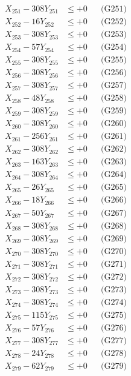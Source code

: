 \documentclass[a4paper,10pt]{article}
\begin{document}
{\begin{align}
\allowbreak
X_{251} - 308Y_{251} &\leq +0 && \text{(G251)} \\
X_{252} - 16Y_{252} &\leq +0 && \text{(G252)} \\
X_{253} - 308Y_{253} &\leq +0 && \text{(G253)} \\
X_{254} - 57Y_{254} &\leq +0 && \text{(G254)} \\
X_{255} - 308Y_{255} &\leq +0 && \text{(G255)} \\
X_{256} - 308Y_{256} &\leq +0 && \text{(G256)} \\
X_{257} - 308Y_{257} &\leq +0 && \text{(G257)} \\
X_{258} - 48Y_{258} &\leq +0 && \text{(G258)} \\
X_{259} - 308Y_{259} &\leq +0 && \text{(G259)} \\
X_{260} - 308Y_{260} &\leq +0 && \text{(G260)} \\
\allowbreak
X_{261} - 256Y_{261} &\leq +0 && \text{(G261)} \\
X_{262} - 308Y_{262} &\leq +0 && \text{(G262)} \\
X_{263} - 163Y_{263} &\leq +0 && \text{(G263)} \\
X_{264} - 308Y_{264} &\leq +0 && \text{(G264)} \\
X_{265} - 26Y_{265} &\leq +0 && \text{(G265)} \\
X_{266} - 18Y_{266} &\leq +0 && \text{(G266)} \\
X_{267} - 50Y_{267} &\leq +0 && \text{(G267)} \\
X_{268} - 308Y_{268} &\leq +0 && \text{(G268)} \\
X_{269} - 308Y_{269} &\leq +0 && \text{(G269)} \\
X_{270} - 308Y_{270} &\leq +0 && \text{(G270)} \\
\allowbreak
X_{271} - 308Y_{271} &\leq +0 && \text{(G271)} \\
X_{272} - 308Y_{272} &\leq +0 && \text{(G272)} \\
X_{273} - 308Y_{273} &\leq +0 && \text{(G273)} \\
X_{274} - 308Y_{274} &\leq +0 && \text{(G274)} \\
X_{275} - 115Y_{275} &\leq +0 && \text{(G275)} \\
X_{276} - 57Y_{276} &\leq +0 && \text{(G276)} \\
X_{277} - 308Y_{277} &\leq +0 && \text{(G277)} \\
X_{278} - 24Y_{278} &\leq +0 && \text{(G278)} \\
X_{279} - 62Y_{279} &\leq +0 && \text{(G279)} \\

\end{align}}
\end{document}
